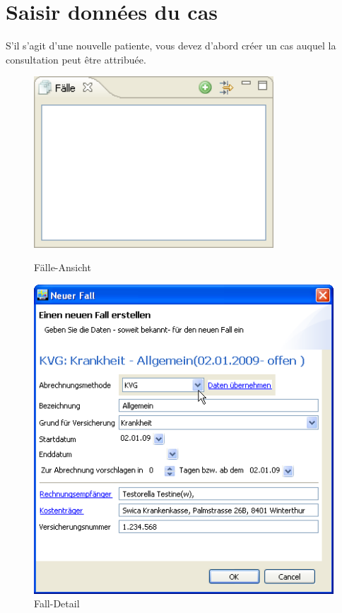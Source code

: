 \section{Saisir données du cas}
S'il s'agit d'une nouvelle patiente, vous devez d'abord créer un  \glqq cas\grqq{} auquel la consultation peut être attribuée.

\begin{figure}[htbp]
     \begin{minipage}{0.4\textwidth}
      \centering
       \includegraphics[width=0.8\textwidth]{images/einf3}
       \caption{Fälle-Ansicht}
       	\label{fig:faelle1}
     \end{minipage}\hfill
     \begin{minipage}{0.6\textwidth}
      \centering
       \includegraphics[width=1.0\textwidth]{images/einf4}
       \caption{Fall-Detail}
       \label{fig:falldetail}
     \end{minipage}
   \end{figure}


